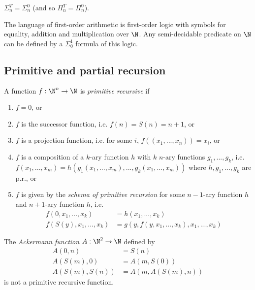 \documentclass{article}
\begin{document}
\begin{theorem*}[Notes I.40]
	$\Sigma_n^T=\Sigma_n^0$ (and so $\Pi_n^T=\Pi_n^0$).
\end{theorem*}

\begin{theorem*}[Notes I.41]
	The language of first-order arithmetic is first-order logic with symbols for
	equality, addition and multiplication over $\N$. Any semi-decidable predicate on
	$\N$ can be defined by a $\Sigma_0^1$ formula of this logic.
\end{theorem*}

\subsection{Primitive and partial recursion}

\begin{definition*}
	A function $f:\N^n\to\N$ is \emph{primitive recursive} if
	\begin{enumerate}[label=R\arabic*.]
		\item $f=0$, or
		\item $f$ is the successor function, i.e. $f(n)=S(n)=n+1$, or
		\item $f$ is a projection function, i.e. for some $i$, $f((x_1,...,x_n))=x_i$, or
		\item $f$ is a composition of a $k$-ary function $h$ with $k$ $n$-ary functions $g_1,...,g_k$, i.e.
		      $f(x_1,...,x_m)=h(g_1(x_1,...,x_m),...,g_k(x_1,...,x_m))$ where $h,g_1,...,g_k$ are p.r., or
		\item $f$ is given by the \emph{schema of primitive recursion} for some $n-1$-ary function $h$ and
		      $n+1$-ary function $h$, i.e.
		      \begin{align*}
			      f(0,x_1,...,x_k)    & = h(x_1,...,x_k)                    \\
			      f(S(y),x_1,...,x_k) & = g(y,f(y,x_1,...,x_k),x_1,...,x_k)
		      \end{align*}
	\end{enumerate}
\end{definition*}

\begin{theorem*}[Notes I.43]
	The \emph{Ackermann function} $A:\N^2\to\N$ defined by
	\begin{align*}
		A(0,n)        & = S(n)             \\
		A(S(m), 0)    & = A(m,S(0))        \\
		A(S(m), S(n)) & = A(m, A(S(m), n))
	\end{align*}
	is not a primitive recursive function.
\end{theorem*}
\end{document}
